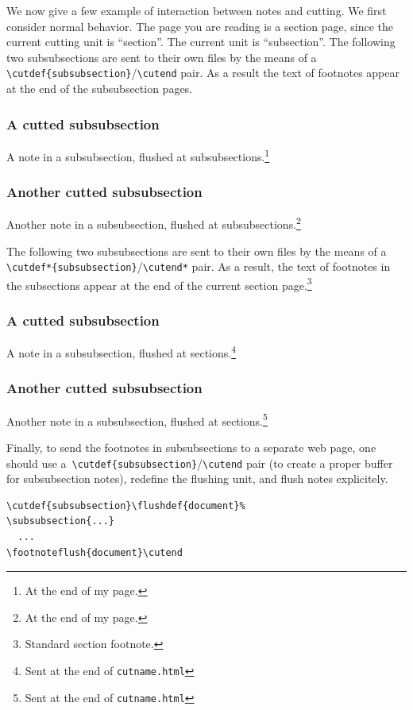 \ifhevea
We now give a few example of interaction between notes and cutting.
We first consider normal behavior.
The page you are reading is a section page, since the current
cutting unit is ``section''. The current unit is ``subsection''.
The following two subsubsections are sent to their own files by
the means of a \verb+\cutdef{subsubsection}+/\verb+\cutend+ pair.
As a result the text of footnotes appear at the end of the
subsubsection pages.
\subsubsection{A cutted subsubsection}
A note in a subsubsection, flushed at subsubsections.\footnote{At the
end of my page.}
\subsubsection{Another cutted subsubsection}
Another note in a subsubsection, flushed at subsubsections.\footnote{At the
end of my page.}
\cutend

The following two subsubsections are sent to their own files by
the means of a \verb+\cutdef*{subsubsection}+/\verb+\cutend*+ pair.
As a result, the text of footnotes in the subsections appear
at the end of the current section page.\footnote{Standard section footnote.}
\subsubsection{A cutted subsubsection}
A note in a subsubsection, flushed at sections.\footnote{Sent at
the end of \texttt{cutname.html}}
\subsubsection{Another cutted subsubsection}
Another note in a subsubsection, flushed at sections.\footnote{Sent at
the end of \texttt{cutname.html}}
\cutend*

Finally, to send the footnotes in subsubsections
to a separate web page, one should use
a~\verb+\cutdef{subsubsection}+/\verb+\cutend+ pair
(to create a proper buffer for subsubsection notes),
redefine the flushing unit, and flush notes explicitely.
\begin{verbatim}
\cutdef{subsubsection}\flushdef{document}%
\subsubsection{...}
  ...
\footnoteflush{document}\cutend
\end{verbatim}

